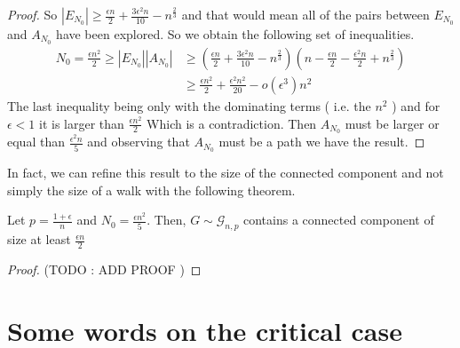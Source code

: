 \begin{proof}
	So $|E_{N_0}| \geq \frac{\epsilon n}{2} + \frac{3\epsilon^2n}{10} - n^{\frac{2}{3}}$ and that would mean all of the pairs between $E_{N_0}$ and $A_{N_0}$ have been explored.
	So we obtain the following set of inequalities.
	\begin{align}
		N_0 = \frac{\epsilon n^2}{2} \geq |E_{N_0}||A_{N_0}| &\geq (\frac{\epsilon n}{2} + \frac{3\epsilon^2n}{10} - n^{\frac{2}{3}} )
									(n - \frac{\epsilon n}{2} - \frac{\epsilon^2 n}{2} + n^{\frac{2}{3}})\\
									&\geq \frac{\epsilon n^2}{2} + \frac{\epsilon ^2 n^2 }{20} - o(\epsilon ^3)n^2 			
	\end{align}
	The last inequality being only with the dominating terms ( i.e. the $n^2$ ) and for $\epsilon < 1$ it is larger than $\frac{\epsilon n^2}{2}$ Which is a contradiction.
	Then $A_{N_0}$ must be larger or equal than $\frac{\epsilon ^2n}{5}$ and observing that $A_{N_0}$ must be a path we have the result.
\end{proof}
In fact, we can refine this result to the size of the connected component and not simply the size of a walk with the following theorem.
\begin{theorem}
	Let $p = \frac{1+\epsilon}{n}$ and $N_0 = \frac{\epsilon n^2}{5}$. Then, $G \sim \mathcal{G}_{n,p}$ contains a connected component of size at least $\frac{\epsilon n}{2}$
\end{theorem}
\begin{proof}
	(TODO : ADD PROOF )
\end{proof}
\section{Some words on the critical case}
